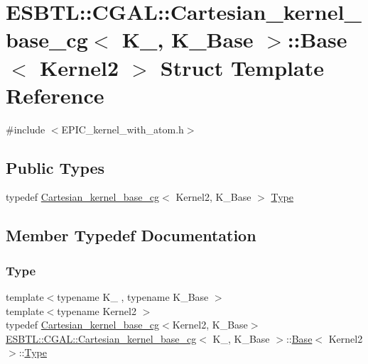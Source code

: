 \hypertarget{structESBTL_1_1CGAL_1_1Cartesian__kernel__base__cg_1_1Base}{}\section{E\+S\+B\+TL\+:\+:C\+G\+AL\+:\+:Cartesian\+\_\+kernel\+\_\+base\+\_\+cg$<$ K\+\_\+, K\+\_\+\+Base $>$\+:\+:Base$<$ Kernel2 $>$ Struct Template Reference}
\label{structESBTL_1_1CGAL_1_1Cartesian__kernel__base__cg_1_1Base}


{\ttfamily \#include $<$E\+P\+I\+C\+\_\+kernel\+\_\+with\+\_\+atom.\+h$>$}

\subsection*{Public Types}
\begin{DoxyCompactItemize}
\item 
typedef \hyperlink{classESBTL_1_1CGAL_1_1Cartesian__kernel__base__cg}{Cartesian\+\_\+kernel\+\_\+base\+\_\+cg}$<$ Kernel2, K\+\_\+\+Base $>$ \hyperlink{structESBTL_1_1CGAL_1_1Cartesian__kernel__base__cg_1_1Base_a72f5bea1557a6eee6bd626c25685e6d4}{Type}
\end{DoxyCompactItemize}


\subsection{Member Typedef Documentation}
\mbox{\label{structESBTL_1_1CGAL_1_1Cartesian__kernel__base__cg_1_1Base_a72f5bea1557a6eee6bd626c25685e6d4}} 
\subsubsection{\texorpdfstring{Type}{Type}}
{\footnotesize\ttfamily template$<$typename K\+\_\+ , typename K\+\_\+\+Base $>$ \\
template$<$typename Kernel2 $>$ \\
typedef \hyperlink{classESBTL_1_1CGAL_1_1Cartesian__kernel__base__cg}{Cartesian\+\_\+kernel\+\_\+base\+\_\+cg}$<$Kernel2, K\+\_\+\+Base$>$ \hyperlink{classESBTL_1_1CGAL_1_1Cartesian__kernel__base__cg}{E\+S\+B\+T\+L\+::\+C\+G\+A\+L\+::\+Cartesian\+\_\+kernel\+\_\+base\+\_\+cg}$<$ K\+\_\+, K\+\_\+\+Base $>$\+::\hyperlink{structESBTL_1_1CGAL_1_1Cartesian__kernel__base__cg_1_1Base}{Base}$<$ Kernel2 $>$\+::\hyperlink{structESBTL_1_1CGAL_1_1Cartesian__kernel__base__cg_1_1Base_a72f5bea1557a6eee6bd626c25685e6d4}{Type}}



